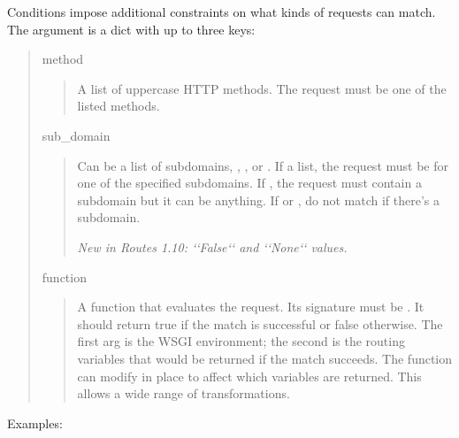 \documentclass[letterpaper,10pt,english]{manual}
\begin{document}
Conditions impose additional constraints on what kinds of requests can match.
The  argument is a dict with up to three keys:
\begin{quote}

method
\begin{quote}

A list of uppercase HTTP methods.  The request must be one of the
listed methods.
\end{quote}

sub\_domain
\begin{quote}

Can be a list of subdomains, , , or .  If a
list, the request must be for one of the specified subdomains.  If
, the request must contain a subdomain but it can be anything.
If  or , do not match if there's a subdomain.

\emph{New in Routes 1.10: {}`{}`False{}`{}` and {}`{}`None{}`{}` values.}
\end{quote}

function
\begin{quote}

A function that evaluates the request.  Its signature must be
.  It should return true if the
match is successful or false otherwise.  The first arg is the WSGI
environment; the second is the routing variables that would be
returned if the match succeeds.  The function can modify 
in place to affect which variables are returned.  This allows a wide
range of transformations.
\end{quote}
\end{quote}

Examples:
\end{document}
